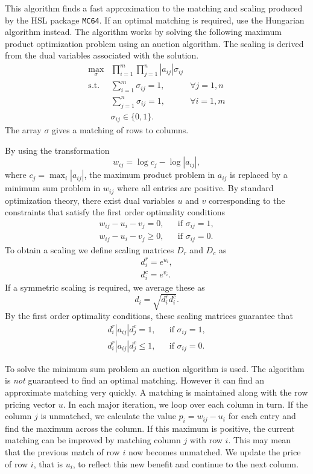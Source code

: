 This algorithm finds a fast approximation to the matching and scaling produced
by the HSL package \texttt{MC64}. If an optimal matching is required, use the
Hungarian algorithm instead. The algorithm works by solving the following
maximum product optimization problem using an auction algorithm. The scaling
is derived from the dual variables associated with the solution.
\begin{eqnarray*}
   \max_{\sigma} & \prod_{i=1}^m\prod_{j=1}^n |a_{ij}|\sigma_{ij} & \\
   \mathrm{s.t.} & \sum_{i=1}^m\sigma_{ij} = 1, & \forall j=1,n \\
                 & \sum_{j=1}^n\sigma_{ij} = 1, & \forall i=1,m \\
                 & \sigma_{ij} \in \{0,1\}.
\end{eqnarray*}
The array $\sigma$ gives a matching of rows to columns.

By using the transformation
$$
   w_{ij} = \log c_j - \log |a_{ij}|,
$$
where $c_j = \max_i |a_{ij}|$, the maximum product problem in $a_{ij}$ is
replaced by a minimum sum problem in $w_{ij}$ where all entries are positive.
By standard optimization theory, there exist dual variables $u$ and $v$
corresponding to the constraints that satisfy the first order optimality
conditions
\begin{eqnarray*}
   w_{ij} - u_i - v_j = 0, && \mbox{if } \sigma_{ij }=1, \\
   w_{ij} - u_i - v_j \ge 0, && \mbox{if } \sigma_{ij }=0.
\end{eqnarray*}
To obtain a scaling we define scaling matrices $D_r$ and $D_c$ as
\begin{eqnarray*}
   & d^r_i = e^{u_i}, & \\
   & d^c_i = e^{v_i}. &
\end{eqnarray*}
If a symmetric scaling is required, we average these as
$$
   d_i = \sqrt{d^r_id^c_i}.
$$
By the first order optimality conditions, these scaling matrices guarantee that
\begin{eqnarray*}
   d^r_i|a_{ij}|d^c_j = 1, && \mbox{if } \sigma_{ij}=1, \\
   d^r_i|a_{ij}|d^c_j \le 1, && \mbox{if } \sigma_{ij}=0.
\end{eqnarray*}

To solve the minimum sum problem an auction algorithm is used. The 
algorithm is \textit{not} guaranteed to find an optimal matching. However it
can find an approximate matching very quickly. A matching is maintained along
with the row pricing vector $u$.
In each major iteration, we loop over each column in turn. If the
column $j$ is unmatched, we calculate the value $p_i = w_{ij} - u_i$ for each
entry and find the maximum across the column. If this maximum is positive, the
current matching can be improved by matching column $j$ with row $i$. This may
mean that the previous match of row $i$ now becomes unmatched. We update the
price of row $i$, that is $u_i$, to reflect this new benefit and continue to the
next column.

